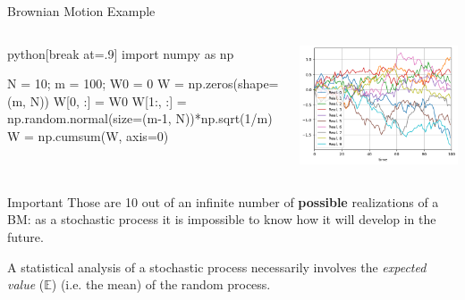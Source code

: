 \documentclass{beamer}
\begin{document}
\begin{frame}[fragile]{Brownian Motion Example}
\begin{columns}
\begin{mintedbox}{python}[break at=.9\textheight]
import numpy as np

N = 10; m = 100; W0 = 0
W = np.zeros(shape=(m, N))
W[0, :] = W0
W[1:, :] = np.random.normal(size=(m-1, N))*np.sqrt(1/m)
W = np.cumsum(W, axis=0)
\end{mintedbox}
    \includegraphics[width=1.\linewidth]{images/bm_realizations}
\end{columns}
\begin{block}{Important}
Those are 10 out of an infinite number of \textbf{possible} realizations of a  BM: as a stochastic process it is impossible to know how it will develop in the future.

A statistical analysis of a stochastic process necessarily involves the \emph{expected value} ($\mathbb{E}$) (i.e. the mean) of the random process.
\end{block}
\end{frame}
\end{document}
